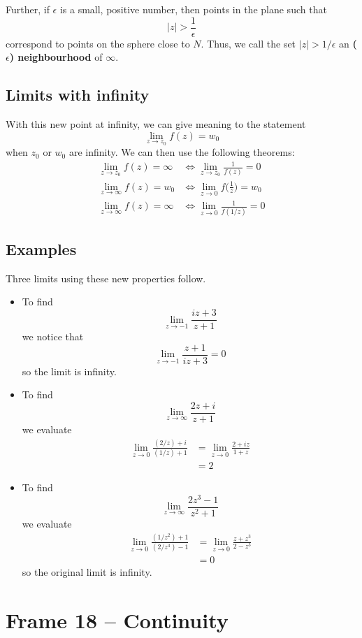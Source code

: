\documentclass{article}
\renewcommand{\emph}{\textbf}
\begin{document}
Further, if $\epsilon$ is a small, positive number, then points in the plane such that
\[
	|z| > \frac{1}{\epsilon}
\]
correspond to points on the sphere close to $N$. Thus, we call the set $|z| > 1/\epsilon$ an \emph{($\epsilon$) neighbourhood} of $\infty$.

\subsection{Limits with infinity}
With this new point at infinity, we can give meaning to the statement
\[
	\lim_{z \to z_0} f(z) = w_0
\]
when $z_0$ or $w_0$ are infinity. We can then use the following theorems:
\begin{align*}
	\lim_{z \to z_0} f(z) = \infty &\iff \lim_{z \to z_0} \frac{1}{f(z)} = 0 \\
	\lim_{z \to \infty} f(z) = w_0 &\iff \lim_{z \to 0} f\Big(\frac{1}{z}\Big) = w_0 \\
	\lim_{z \to \infty} f(z) = \infty &\iff \lim_{z \to 0} \frac{1}{f(1/z)} = 0
\end{align*}

\subsection{Examples}
Three limits using these new properties follow.
\begin{itemize}
\item To find
\[
	\lim_{z \to -1} \frac{iz + 3}{z + 1}
\]
we notice that
\[
	\lim_{z \to -1} \frac{z + 1}{iz + 3} = 0
\]
so the limit is infinity.

\item To find
\[
	\lim_{z \to \infty} \frac{2z + i}{z + 1}
\]
we evaluate
\begin{align*}
	\lim_{z \to 0} \frac{(2 / z) + i}{(1 / z) + 1} 
	&= \lim_{z \to 0} \frac{2 + iz}{1 + z} \\
	&= 2
\end{align*}

\item To find
\[
	\lim_{z \to \infty} \frac{2z^3 - 1}{z^2 + 1}
\]
we evaluate
\begin{align*}
	\lim_{z \to 0} \frac{(1/z^2) + 1}{(2/z^3) - 1}
	&= \lim_{z \to 0} \frac{z + z^3}{2 - z^3} \\
	&= 0
\end{align*}
so the original limit is infinity.
\end{itemize}


\clearpage
\section{Frame 18 -- Continuity}
\end{document}
